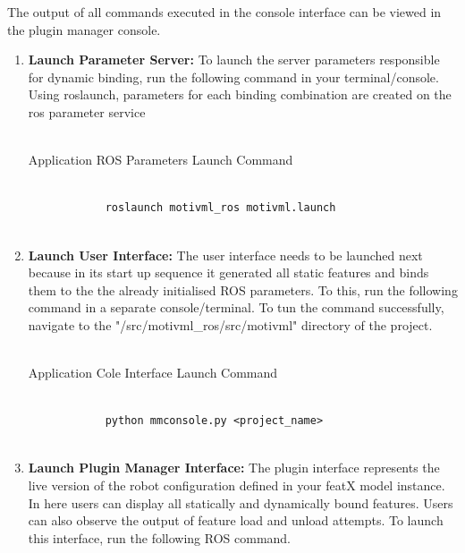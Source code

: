 \documentclass{article}
\newenvironment{longlisting}{\captionsetup{type=listing}}{}
\begin{document}
The output of all commands executed in the console interface can be viewed in the plugin manager console.
\begin{enumerate}
	\item \textbf{Launch Parameter Server: } To launch the server parameters responsible for dynamic binding, run the following command in your terminal/console. Using roslaunch, parameters for each binding combination are created on the ros parameter service\\\\
	
	\begin{longlisting}
		\caption{Application ROS Parameters Launch Command}
		\begin{verbatim}
			
			roslaunch motivml_ros motivml.launch
			
		\end{verbatim}
		\label{paramlaunch}
	\end{longlisting}
	
	
	\item \textbf{Launch User Interface: } The user interface needs to be launched next because in its start up sequence it generated all static features and binds them to the the already initialised ROS parameters. To this, run the following command in a separate console/terminal. To tun the command successfully, navigate to the "/src/motivml\_ros/src/motivml" directory of the project.\\\\
	
	\begin{longlisting}
		\caption{Application Cole Interface Launch Command}
		\begin{verbatim}
			
			python mmconsole.py <project_name>
			
		\end{verbatim}
		\label{ui}
	\end{longlisting}

	\item \textbf{Launch Plugin Manager Interface: } The plugin interface represents the live version of the robot configuration defined in your featX model instance. In here users can display all statically and dynamically bound features. Users can also observe the output of feature load and unload attempts. To launch this interface, run the following ROS command. \\\\
	

\end{enumerate}
\end{document}
